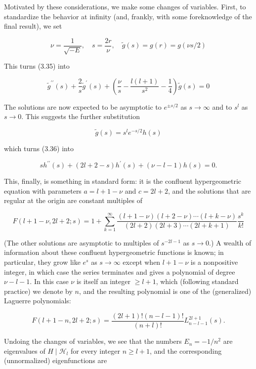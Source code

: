 \documentclass[10pt, letterpaper]{article}
\begin{document}
Motivated by these considerations, we make some changes of variables. First, to standardize the behavior at infinity (and, frankly, with some foreknowledge of the final result), we set

$$
\nu=\frac{1}{\sqrt{-E}}, \quad s=\frac{2 r}{\nu}, \quad \widetilde{g}(s)=g(r)=g(\nu s / 2)
$$

This turns (3.35) into

$$
\widetilde{g}^{\prime \prime}(s)+\frac{2}{s} \widetilde{g}^{\prime}(s)+\left(\frac{\nu}{s}-\frac{l(l+1)}{s^{2}}-\frac{1}{4}\right) \widetilde{g}(s)=0
$$

The solutions are now expected to be asymptotic to $e^{ \pm s / 2}$ as $s \rightarrow \infty$ and to $s^{l}$ as $s \rightarrow 0$. This suggests the further substitution

$$
\widetilde{g}(s)=s^{l} e^{-s / 2} h(s)
$$

which turns (3.36) into

$$
s h^{\prime \prime}(s)+(2 l+2-s) h^{\prime}(s)+(\nu-l-1) h(s)=0 .
$$

This, finally, is something in standard form: it is the confluent hypergeometric equation with parameters $a=l+1-\nu$ and $c=2 l+2$, and the solutions that are regular at the origin are constant multiples of

$$
F(l+1-\nu, 2 l+2 ; s)=1+\sum_{k=1}^{\infty} \frac{(l+1-\nu)(l+2-\nu) \cdots(l+k-\nu)}{(2 l+2)(2 l+3) \cdots(2 l+k+1)} \frac{s^{k}}{k!}
$$

(The other solutions are asymptotic to multiples of $s^{-2 l-1}$ as $s \rightarrow 0$.) A wealth of information about these confluent hypergeometric functions is known; in particular, they grow like $e^{s}$ as $s \rightarrow \infty$ except when $l+1-\nu$ is a nonpositive integer, in which case the series terminates and gives a polynomial of degree $\nu-l-1$. In this case $\nu$ is itself an integer $\geq l+1$, which (following standard practice) we denote by $n$, and the resulting polynomial is one of the (generalized) Laguerre polynomials:

$$
F(l+1-n, 2 l+2 ; s)=\frac{(2 l+1)!(n-l-1)!}{(n+l)!} L_{n-l-1}^{2 l+1}(s) .
$$

Undoing the changes of variables, we see that the numbers $E_{n}=-1 / n^{2}$ are eigenvalues of $H \mid \mathcal{H}_{l}$ for every integer $n \geq l+1$, and the corresponding (unnormalized) eigenfunctions are
\end{document}
